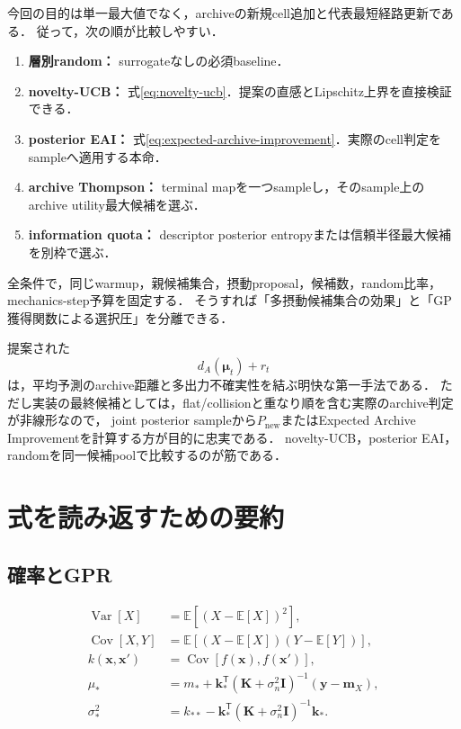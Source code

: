 \documentclass[a4paper,11pt]{ltjsarticle}
\newcommand{\E}{\mathbb E}
\newcommand{\I}{\bm I}
\newcommand{\T}{\mathsf T}
\newcommand{\Var}{\operatorname{Var}}
\newcommand{\Cov}{\operatorname{Cov}}
\begin{document}
今回の目的は単一最大値でなく，archiveの新規cell追加と代表最短経路更新である．
従って，次の順が比較しやすい．

\begin{enumerate}
  \item \textbf{層別random：} surrogateなしの必須baseline．
  \item \textbf{novelty-UCB：} 式\eqref{eq:novelty-ucb}．提案の直感とLipschitz上界を直接検証できる．
  \item \textbf{posterior EAI：} 式\eqref{eq:expected-archive-improvement}．実際のcell判定をsampleへ適用する本命．
  \item \textbf{archive Thompson：} terminal mapを一つsampleし，そのsample上のarchive utility最大候補を選ぶ．
  \item \textbf{information quota：} descriptor posterior entropyまたは信頼半径最大候補を別枠で選ぶ．
\end{enumerate}

全条件で，同じwarmup，親候補集合，摂動proposal，候補数，random比率，mechanics-step予算を固定する．
そうすれば「多摂動候補集合の効果」と「GP獲得関数による選択圧」を分離できる．

\begin{applicationbox}[最終的な推奨]
提案された
\begin{equation*}
  d_A(\bm\mu_t)+r_t
\end{equation*}
は，平均予測のarchive距離と多出力不確実性を結ぶ明快な第一手法である．
ただし実装の最終候補としては，flat/collisionと重なり順を含む実際のarchive判定が非線形なので，
joint posterior sampleから\(P_{\mathrm{new}}\)またはExpected Archive Improvementを計算する方が目的に忠実である．
novelty-UCB，posterior EAI，randomを同一候補poolで比較するのが筋である．
\end{applicationbox}

\section{式を読み返すための要約}
\label{sec:formula-summary}

\subsection{確率とGPR}

\begin{align}
  \Var[X]&=\E[(X-\E[X])^2],\\
  \Cov[X,Y]&=\E[(X-\E[X])(Y-\E[Y])],\\
  k(\bm x,\bm x')&=\Cov[f(\bm x),f(\bm x')],\\
  \mu_*&=m_*+\bm k_*^\T(\bm K+\sigma_n^2\I)^{-1}(\bm y-\bm m_X),\\
  \sigma_*^2&=k_{**}-\bm k_*^\T(\bm K+\sigma_n^2\I)^{-1}\bm k_*.
\end{align}
\end{document}
